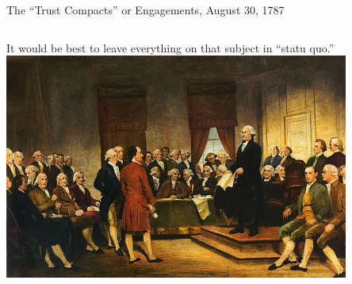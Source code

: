 \begin{frame}{The ``Trust Compacts'' or Engagements, August 30, 1787}
    \begin{columns}[onlytextwidth]
            { \Large It would be best to leave everything on that subject in ``statu quo.'' }
            \centering
            \includegraphics[width=0.85\textwidth]{img/convention.png} \\
    \end{columns}
\end{frame}

